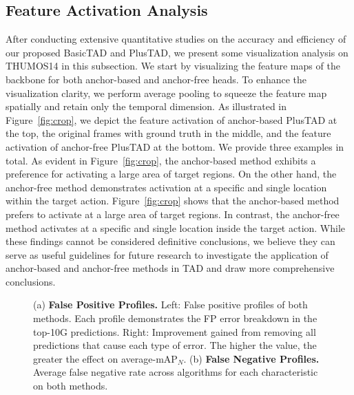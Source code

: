 \documentclass[a4paper,fleqn]{cas-dc}
\begin{document}
\subsection{Feature Activation Analysis}
\label{featureactivationanalysis}
After conducting extensive quantitative studies on the accuracy and efficiency of our proposed BasicTAD and PlusTAD, we present some visualization analysis on THUMOS14 in this subsection. We start by visualizing the feature maps of the backbone for both anchor-based and anchor-free heads. To enhance the visualization clarity, we perform average pooling to squeeze the feature map spatially and retain only the temporal dimension. As illustrated in Figure~\ref{fig:crop}, we depict the feature activation of anchor-based PlusTAD at the top, the original frames with ground truth in the middle, and the feature activation of anchor-free PlusTAD at the bottom. We provide three examples in total.
As evident in Figure~\ref{fig:crop}, the anchor-based method exhibits a preference for activating a large area of target regions. On the other hand, the anchor-free method demonstrates activation at a specific and single location within the target action.
Figure~\ref{fig:crop} shows that the anchor-based method prefers to activate at a large area of target regions. 
In contrast, the anchor-free method activates at a specific and single location inside the target action. While these findings cannot be considered definitive conclusions, we believe they can serve as useful guidelines for future research to investigate the application of anchor-based and anchor-free methods in TAD and draw more comprehensive conclusions.




\begin{figure*}[htbp!]  
	\centering
    
    \vspace{-4mm}
    \setcounter{subfigure}{0}
	\caption{(a) \textbf{False Positive Profiles.} Left: False positive profiles of both methods. Each profile demonstrates the FP error breakdown in the top-10G predictions. Right: Improvement gained from removing all predictions that cause each type of error. The higher the value, the greater the effect on average-mAP$_{N}$.
  (b) \textbf{False Negative Profiles.} Average false negative rate across algorithms for each characteristic on both methods. }
  \label{fig:fp_fn}
	
\end{figure*}
\end{document}
